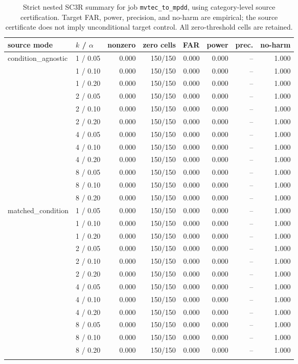\begin{table}[t]
\centering
\caption{Strict nested SC3R summary for job \texttt{mvtec\_to\_mpdd}, using category-level source certification. Target FAR, power, precision, and no-harm are empirical; the source certificate does not imply unconditional target control. All zero-threshold cells are retained.}
\label{tab:nested-sc3r-mvtec-to-mpdd}
\footnotesize
\setlength{\tabcolsep}{4pt}
\begin{tabular}{llrrrrrr}
\toprule
source mode & $k$ / $\alpha$ & nonzero & zero cells & FAR & power & prec. & no-harm \\
\midrule
condition\_agnostic & 1 / 0.05 & 0.000 & 150/150 & 0.000 & 0.000 & -- & 1.000 \\
 & 1 / 0.10 & 0.000 & 150/150 & 0.000 & 0.000 & -- & 1.000 \\
 & 1 / 0.20 & 0.000 & 150/150 & 0.000 & 0.000 & -- & 1.000 \\
 & 2 / 0.05 & 0.000 & 150/150 & 0.000 & 0.000 & -- & 1.000 \\
 & 2 / 0.10 & 0.000 & 150/150 & 0.000 & 0.000 & -- & 1.000 \\
 & 2 / 0.20 & 0.000 & 150/150 & 0.000 & 0.000 & -- & 1.000 \\
 & 4 / 0.05 & 0.000 & 150/150 & 0.000 & 0.000 & -- & 1.000 \\
 & 4 / 0.10 & 0.000 & 150/150 & 0.000 & 0.000 & -- & 1.000 \\
 & 4 / 0.20 & 0.000 & 150/150 & 0.000 & 0.000 & -- & 1.000 \\
 & 8 / 0.05 & 0.000 & 150/150 & 0.000 & 0.000 & -- & 1.000 \\
 & 8 / 0.10 & 0.000 & 150/150 & 0.000 & 0.000 & -- & 1.000 \\
 & 8 / 0.20 & 0.000 & 150/150 & 0.000 & 0.000 & -- & 1.000 \\
\addlinespace[2pt]
matched\_condition & 1 / 0.05 & 0.000 & 150/150 & 0.000 & 0.000 & -- & 1.000 \\
 & 1 / 0.10 & 0.000 & 150/150 & 0.000 & 0.000 & -- & 1.000 \\
 & 1 / 0.20 & 0.000 & 150/150 & 0.000 & 0.000 & -- & 1.000 \\
 & 2 / 0.05 & 0.000 & 150/150 & 0.000 & 0.000 & -- & 1.000 \\
 & 2 / 0.10 & 0.000 & 150/150 & 0.000 & 0.000 & -- & 1.000 \\
 & 2 / 0.20 & 0.000 & 150/150 & 0.000 & 0.000 & -- & 1.000 \\
 & 4 / 0.05 & 0.000 & 150/150 & 0.000 & 0.000 & -- & 1.000 \\
 & 4 / 0.10 & 0.000 & 150/150 & 0.000 & 0.000 & -- & 1.000 \\
 & 4 / 0.20 & 0.000 & 150/150 & 0.000 & 0.000 & -- & 1.000 \\
 & 8 / 0.05 & 0.000 & 150/150 & 0.000 & 0.000 & -- & 1.000 \\
 & 8 / 0.10 & 0.000 & 150/150 & 0.000 & 0.000 & -- & 1.000 \\
 & 8 / 0.20 & 0.000 & 150/150 & 0.000 & 0.000 & -- & 1.000 \\
\addlinespace[2pt]
\bottomrule
\end{tabular}
\end{table}
